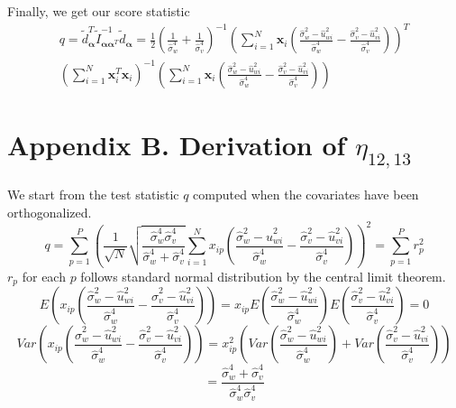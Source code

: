 \documentclass[aap,authoryear, preprint]{imsart}
\numberwithin{equation}{section}
\theoremstyle{plain}
\begin{document}
Finally, we get our score statistic
\begin{equation}
    \begin{multlined}
    q = \tilde{d}_{\bm{\alpha}}^T \tilde{I}_{\bm{\alpha}\bm{\alpha}^T}^{-1}
    \tilde{d}_{\bm{\alpha}}
    =\frac{1}{2}\left( \frac{1}{\hat{\sigma}_w^4}+\frac{1}{\hat{\sigma}_v^4}\right)^{-1}
\left(\sum_{i=1}^{N} \bm{x}_{i} 
\left(
\frac{\hat{\sigma}_w^2-\hat{u}_{wi}^2}{\hat{\sigma}_w^4}- \frac{\hat{\sigma}_v^2-\hat{u}_{vi}^2}{\hat{\sigma}_v^4}
\right)
\right)^T \\
\left( \sum_{i=1}^{N} \bm{x}_i^T \bm{x}_i \right)^{-1}
\left(
\sum_{i=1}^{N} \bm{x}_{i} 
\left(
\frac{\hat{\sigma}_w^2-\hat{u}_{wi}^2}{\hat{\sigma}_w^4}- \frac{\hat{\sigma}_v^2-\hat{u}_{vi}^2}{\hat{\sigma}_v^4}
\right)
\right)
    \end{multlined}
\end{equation}


\section*{Appendix B. Derivation of $\eta_{12,13}$}
We start from the test statistic $q$ computed when the covariates have been orthogonalized.
$$q = \sum_{p=1}^{P}
 \left(\frac{1}{\sqrt{N}}
 \sqrt{\frac{\hat{\sigma}_w^4 \hat{\sigma}_v^4}{\hat{\sigma}_w^4 + \hat{\sigma}_v^4}}
 \sum_{i=1}^{N} x_{ip} \left( \frac{\hat{\sigma}_w^2 - \hat{u}_{wi}^2}{\hat{\sigma}_w^4}
 - \frac{\hat{\sigma}_v^2 - \hat{u}_{vi}^2}{\hat{\sigma}_v^4}
 \right)
\right)^2 = \sum_{p=1}^{P}r_p^2$$
$r_p$ for each $p$ follows standard normal distribution by the central limit theorem. 
$$E\left(x_{ip}\left( \frac{\hat{\sigma}_w^2 - \hat{u}_{wi}^2}{\hat{\sigma}_w^4}
 - \frac{\hat{\sigma}_v^2 - \hat{u}_{vi}^2}{\hat{\sigma}_v^4}
 \right)\right) = x_{ip} E\left( \frac{\hat{\sigma}_w^2 - \hat{u}_{wi}^2}{\hat{\sigma}_w^4} \right) E\left( \frac{\hat{\sigma}_v^2 - \hat{u}_{vi}^2}{\hat{\sigma}_v^4}
 \right) = 0$$
$$Var\left(x_{ip}\left( \frac{\hat{\sigma}_w^2 - \hat{u}_{wi}^2}{\hat{\sigma}_w^4}
- \frac{\hat{\sigma}_v^2 - \hat{u}_{vi}^2}{\hat{\sigma}_v^4}
\right)\right) = 
x_{ip}^2 \left( Var\left( \frac{\hat{\sigma}_w^2 - \hat{u}_{wi}^2}{\hat{\sigma}_w^4} \right)  + Var\left( \frac{\hat{\sigma}_v^2 - \hat{u}_{vi}^2}{\hat{\sigma}_v^4}\right)\right)$$
 $$ = \frac{\hat{\sigma}_w^4 + \hat{\sigma}_v^4}{\hat{\sigma}_w^4 \hat{\sigma}_v^4}$$
\end{document}
